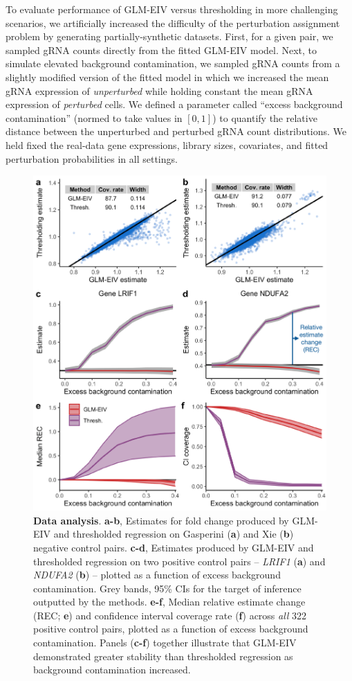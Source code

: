 \documentclass[12pt]{article}
\begin{document}
To evaluate performance of GLM-EIV versus thresholding in more challenging scenarios, we artificially increased the difficulty of the perturbation assignment problem by generating partially-synthetic datasets. First, for a given pair, we sampled gRNA counts directly from the fitted GLM-EIV model. Next, to simulate elevated background contamination, we sampled gRNA counts from a slightly modified version of the fitted model in which we increased the mean gRNA expression of \textit{unperturbed} while holding constant the mean gRNA expression of \textit{perturbed} cells. We defined a parameter called ``excess background contamination'' (normed to take values in $[0,1]$) to quantify the relative distance between the unperturbed and perturbed gRNA count distributions.  We held fixed the real-data gene expressions, library sizes, covariates, and fitted perturbation probabilities in all settings.

\begin{figure}[h!]
	\centering
	\includegraphics[width=0.9\linewidth]{figures/data_analysis.pdf}
	\caption{\textbf{Data analysis}. \textbf{a-b}, Estimates for fold change produced by GLM-EIV and thresholded regression on Gasperini (\textbf{a}) and Xie (\textbf{b}) negative control pairs. \textbf{c-d}, Estimates produced by GLM-EIV and thresholded regression on two positive control pairs -- \textit{LRIF1} (\textbf{a}) and \textit{NDUFA2} (\textbf{b}) -- plotted as a function of excess background contamination. Grey bands, 95\% CIs for the target of inference outputted by the methods. \textbf{e-f}, Median relative estimate change (REC; \textbf{e}) and confidence interval coverage rate (\textbf{f}) across \textit{all} 322 positive control pairs, plotted as a function of excess background contamination. Panels (\textbf{c-f}) together illustrate that GLM-EIV demonstrated greater stability than thresholded regression as background contamination increased.}\label{fig:real_data}
\end{figure}
\end{document}
